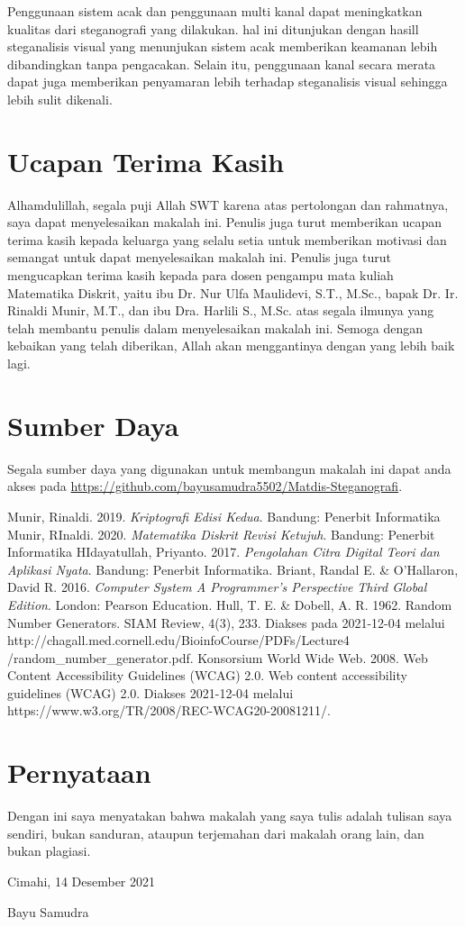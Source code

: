 \documentclass[10pt,conference]{IEEEtran}
\theoremstyle{definition}
\begin{document}
Penggunaan sistem acak dan penggunaan multi kanal dapat meningkatkan kualitas dari steganografi yang dilakukan. hal ini ditunjukan dengan hasill steganalisis visual yang menunjukan sistem acak memberikan keamanan lebih
dibandingkan tanpa pengacakan. Selain itu, penggunaan kanal secara merata dapat juga memberikan penyamaran lebih terhadap steganalisis visual sehingga lebih sulit dikenali.

\section*{Ucapan Terima Kasih}
Alhamdulillah, segala puji Allah SWT karena atas pertolongan dan rahmatnya, saya dapat menyelesaikan makalah ini. Penulis juga turut memberikan ucapan terima kasih kepada keluarga yang selalu setia untuk
memberikan motivasi dan semangat untuk dapat menyelesaikan makalah ini. Penulis juga turut mengucapkan terima kasih kepada para dosen pengampu mata kuliah Matematika Diskrit, yaitu ibu Dr. Nur Ulfa Maulidevi, S.T., M.Sc., bapak Dr. Ir.
Rinaldi Munir, M.T., dan ibu Dra. Harlili S., M.Sc. atas segala ilmunya yang telah membantu penulis dalam menyelesaikan makalah ini. Semoga dengan kebaikan yang telah diberikan, Allah akan menggantinya dengan yang lebih baik lagi.

\section*{Sumber Daya}
Segala sumber daya yang digunakan untuk membangun makalah ini dapat anda akses pada \url{https://github.com/bayusamudra5502/Matdis-Steganografi}.

\begin{thebibliography}{00}
 Munir, Rinaldi. 2019. \emph{Kriptografi Edisi Kedua}. Bandung: Penerbit Informatika 
 Munir, RInaldi. 2020. \emph{Matematika Diskrit Revisi Ketujuh}. Bandung: Penerbit Informatika
 HIdayatullah, Priyanto. 2017. \emph{Pengolahan Citra Digital Teori dan Aplikasi Nyata}. Bandung: Penerbit Informatika.
 Briant, Randal E. \& O'Hallaron, David R. 2016. \emph{Computer System A Programmer's Perspective Third Global Edition}. London: Pearson Education.
 Hull, T. E. \& Dobell, A. R. 1962. Random Number Generators. SIAM Review, 4(3), 233. Diakses pada 2021-12-04 melalui http://chagall.med.cornell.edu/BioinfoCourse/PDFs/Lecture4\\
/random\_number\_generator.pdf.
 Konsorsium World Wide Web. 2008. Web Content Accessibility Guidelines (WCAG) 2.0. Web content accessibility guidelines (WCAG) 2.0. Diakses 2021-12-04 melalui https://www.w3.org/TR/2008/REC-WCAG20-20081211/. 
\end{thebibliography}

\section*{Pernyataan}
Dengan ini saya menyatakan bahwa makalah yang saya tulis adalah tulisan saya sendiri, bukan sanduran, ataupun terjemahan dari makalah orang lain, dan bukan plagiasi.


\vspace{20px}
\hspace*{\fill} Cimahi, 14 Desember 2021

\vspace{30px}
\hspace*{\fill} Bayu Samudra
\end{document}
